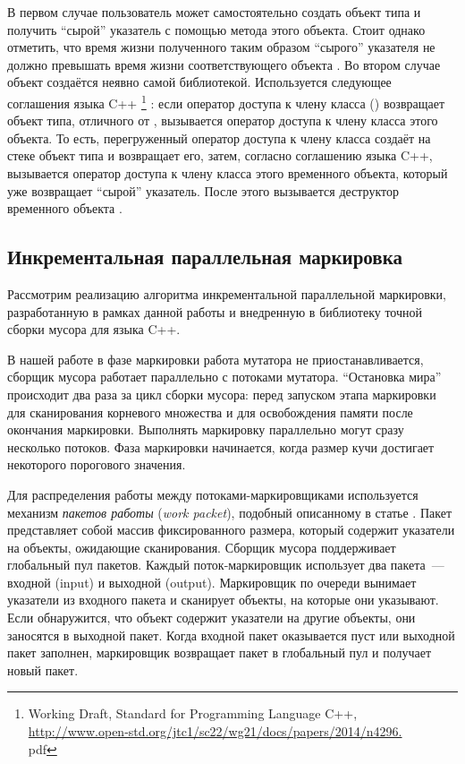 В первом случае пользователь может самостоятельно создать объект типа  и 
получить ``сырой'' указатель с помощью метода  этого объекта. 
Стоит однако отметить, что время жизни полученного таким образом ``сырого'' указателя не 
должно превышать время жизни соответствующего объекта . 
Во втором случае объект  создаётся неявно самой библиотекой. 
Используется следующее соглашения языка C++ 
\footnote{Working Draft, Standard for Programming Language C++,\\
\url{http://www.open-std.org/jtc1/sc22/wg21/docs/papers/2014/n4296.}\\{pdf}}
: если оператор доступа к 
члену класса () возвращает объект типа, отличного от , 
вызывается оператор доступа к члену класса этого объекта. 
То есть, перегруженный оператор доступа к члену класса  создаёт на стеке 
объект типа  и возвращает его, затем, согласно соглашению языка C++, 
вызывается оператор доступа к члену класса этого временного объекта, который уже возвращает 
``сырой'' указатель. 
После этого вызывается деструктор временного объекта .  


\subsection{Инкрементальная параллельная маркировка}
Рассмотрим реализацию алгоритма инкрементальной параллельной маркировки, разработанную в 
рамках данной работы и внедренную в библиотеку точной сборки мусора для языка C++.

В нашей работе в фазе маркировки работа мутатора не приостанавливается, сборщик мусора 
работает параллельно с потоками мутатора. 
``Остановка мира'' происходит два раза за цикл сборки мусора: перед запуском этапа 
маркировки для сканирования корневого множества и для освобождения памяти после 
окончания маркировки. 
Выполнять маркировку параллельно могут сразу несколько потоков. 
Фаза маркировки начинается, когда размер кучи достигает некоторого порогового значения. 

Для распределения работы между потоками-маркировщиками используется механизм 
\emph{пакетов работы} (\emph{work packet}), подобный описанному в статье 
\cite{barabash2005parallel}. 
Пакет представляет собой массив фиксированного размера, который содержит указатели на 
объекты, ожидающие сканирования. 
Сборщик мусора поддерживает глобальный пул пакетов. 
Каждый поток-маркировщик использует два пакета~--- входной (input) и выходной (output). 
Маркировщик по очереди вынимает указатели из входного пакета и сканирует объекты, на которые 
они указывают. 
Если обнаружится, что объект содержит указатели на другие объекты, они заносятся в выходной 
пакет. 
Когда входной пакет оказывается пуст или выходной пакет заполнен, маркировщик возвращает пакет 
в глобальный пул и получает новый пакет. 

